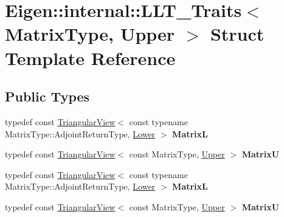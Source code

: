 \hypertarget{struct_eigen_1_1internal_1_1_l_l_t___traits_3_01_matrix_type_00_01_upper_01_4}{}\section{Eigen\+:\+:internal\+:\+:L\+L\+T\+\_\+\+Traits$<$ Matrix\+Type, Upper $>$ Struct Template Reference}
\label{struct_eigen_1_1internal_1_1_l_l_t___traits_3_01_matrix_type_00_01_upper_01_4}
\subsection*{Public Types}
\begin{DoxyCompactItemize}
\item 
\mbox{\label{struct_eigen_1_1internal_1_1_l_l_t___traits_3_01_matrix_type_00_01_upper_01_4_acc67b68b1b03d8e4e2d1a01995de3e64}} 
typedef const \hyperlink{group___core___module_class_eigen_1_1_triangular_view}{Triangular\+View}$<$ const typename Matrix\+Type\+::\+Adjoint\+Return\+Type, \hyperlink{group__enums_gga39e3366ff5554d731e7dc8bb642f83cda891792b8ed394f7607ab16dd716f60e6}{Lower} $>$ {\bfseries MatrixL}
\item 
\mbox{\label{struct_eigen_1_1internal_1_1_l_l_t___traits_3_01_matrix_type_00_01_upper_01_4_a0ffd546ce7ee0c74c45e092d716c523f}} 
typedef const \hyperlink{group___core___module_class_eigen_1_1_triangular_view}{Triangular\+View}$<$ const Matrix\+Type, \hyperlink{group__enums_gga39e3366ff5554d731e7dc8bb642f83cda6bcb58be3b8b8ec84859ce0c5ac0aaec}{Upper} $>$ {\bfseries MatrixU}
\item 
\mbox{\label{struct_eigen_1_1internal_1_1_l_l_t___traits_3_01_matrix_type_00_01_upper_01_4_acc67b68b1b03d8e4e2d1a01995de3e64}} 
typedef const \hyperlink{group___core___module_class_eigen_1_1_triangular_view}{Triangular\+View}$<$ const typename Matrix\+Type\+::\+Adjoint\+Return\+Type, \hyperlink{group__enums_gga39e3366ff5554d731e7dc8bb642f83cda891792b8ed394f7607ab16dd716f60e6}{Lower} $>$ {\bfseries MatrixL}
\item 
\mbox{\label{struct_eigen_1_1internal_1_1_l_l_t___traits_3_01_matrix_type_00_01_upper_01_4_a0ffd546ce7ee0c74c45e092d716c523f}} 
typedef const \hyperlink{group___core___module_class_eigen_1_1_triangular_view}{Triangular\+View}$<$ const Matrix\+Type, \hyperlink{group__enums_gga39e3366ff5554d731e7dc8bb642f83cda6bcb58be3b8b8ec84859ce0c5ac0aaec}{Upper} $>$ {\bfseries MatrixU}
\end{DoxyCompactItemize}
